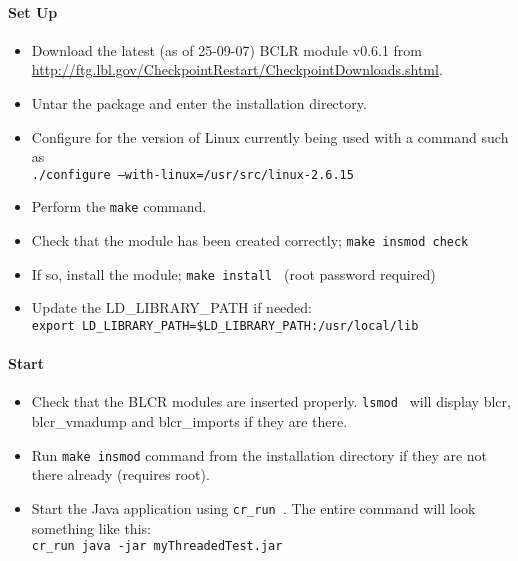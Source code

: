 \paragraph{Set Up}
\begin{itemize}
\item Download the latest (as of 25-09-07) BCLR module v0.6.1 from\newline
	\href{http://ftg.lbl.gov/CheckpointRestart/CheckpointDownloads.shtml}{http://ftg.lbl.gov/CheckpointRestart/CheckpointDownloads.shtml}.
\item Untar the package and enter the installation directory.
\item Configure for the version of Linux currently being used with a command such as\\ {\tt ./configure --with-linux=/usr/src/linux-2.6.15}
\item Perform the {\tt make} command.
\item Check that the module has been created correctly; {\tt make insmod check }
\item If so, install the module; {\tt make install } (root password required)
\item Update the LD\_LIBRARY\_PATH if needed:\\
 \mbox{\footnotesize\tt export LD\_LIBRARY\_PATH=\$LD\_LIBRARY\_PATH:/usr/local/lib }
\end{itemize}

\paragraph{Start}
\begin{itemize}
\item Check that the BLCR modules are inserted properly. {\tt lsmod } will display blcr, blcr\_vmadump and blcr\_imports if they are there.
\item Run {\tt make insmod} command from the installation directory if they are not there already (requires root).
\item Start the Java application using {\tt cr\_run }. The entire command will look something like this:\\{\tt cr\_run java -jar myThreadedTest.jar}
\end{itemize}


